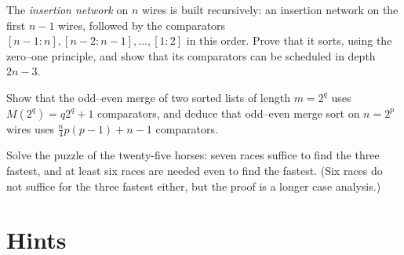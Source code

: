 \begin{exercise}[$\star\star$]\label{ex:insertionnet}
The \emph{insertion network} on $n$ wires is built recursively: an insertion network on the first $n-1$ wires, followed by the comparators $[n-1:n],[n-2:n-1],\dots,[1:2]$ in this
order. Prove that it sorts, using the zero--one principle, and show that its comparators can be scheduled in depth $2n-3$.
\end{exercise}

\begin{exercise}[$\star\star$]\label{ex:oddevencount}
Show that the odd--even merge of two sorted lists of length $m=2^q$ uses $M(2^q)=q2^q+1$ comparators, and deduce that odd--even merge sort on $n=2^p$ wires uses $\frac n4p(p-1)+n-1$ comparators.
\end{exercise}

\begin{exercise}[$\star\star$]\label{ex:horses}
Solve the puzzle of the twenty-five horses: seven races suffice to find the three fastest, and at least six races are needed even to find the fastest. (Six races do not suffice for the three
fastest either, but the proof is a longer case analysis.)
\end{exercise}

\section{Hints}

